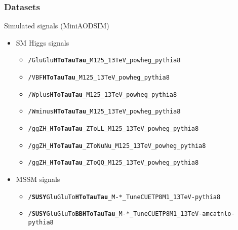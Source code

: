 \begin{frame}
\frametitle{Datasets}

\begin{block}{Simulated signals (MiniAODSIM)}
\begin{itemize}
\item SM Higgs signals
\begin{itemize}
\item \texttt{/GluGlu\textbf{\color{ltcolorred}HToTauTau}\_M125\_13TeV\_powheg\_pythia8}
\item \texttt{/VBF\textbf{\color{ltcolorred}HToTauTau}\_M125\_13TeV\_powheg\_pythia8}
\item \texttt{/Wplus\textbf{\color{ltcolorred}HToTauTau}\_M125\_13TeV\_powheg\_pythia8}
\item \texttt{/Wminus\textbf{\color{ltcolorred}HToTauTau}\_M125\_13TeV\_powheg\_pythia8}
\item \texttt{/ggZH\_\textbf{\color{ltcolorred}HToTauTau}\_ZToLL\_M125\_13TeV\_powheg\_pythia8}
\item \texttt{/ggZH\_\textbf{\color{ltcolorred}HToTauTau}\_ZToNuNu\_M125\_13TeV\_powheg\_pythia8}
\item \texttt{/ggZH\_\textbf{\color{ltcolorred}HToTauTau}\_ZToQQ\_M125\_13TeV\_powheg\_pythia8}
\end{itemize}
\item MSSM signals
\begin{itemize}
\item \texttt{/\textbf{\color{ltcolorred}SUSY}GluGluTo\textbf{\color{ltcolorred}HToTauTau}\_M-*\_TuneCUETP8M1\_13TeV-pythia8}
\item \texttt{/\textbf{\color{ltcolorred}SUSY}GluGluTo\textbf{\color{ltcolorred}BBHToTauTau}\_M-*\_TuneCUETP8M1\_13TeV-amcatnlo-pythia8}
\end{itemize}
\end{itemize}
\end{block}
\end{frame}
